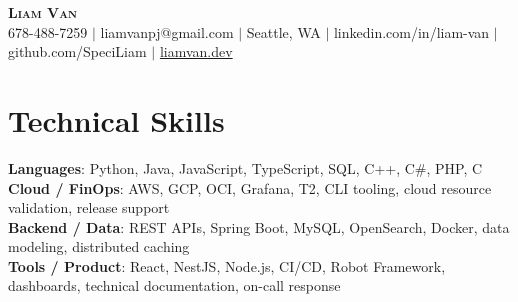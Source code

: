 \documentclass[letterpaper,11pt]{article}
\begin{document}

%
\begin{center}
    \textbf{\Huge \scshape Liam Van} \\ \vspace{1pt}
    \small 678-488-7259 $|$ \small {liamvanpj@gmail.com} $|$ Seattle, WA
 {{$|$ linkedin.com/in/liam-van} {$|$ github.com/SpeciLiam} {$|$ \href{https://liamvan.dev}{liamvan.dev}}}

\end{center}

\section{Technical Skills}
 \begin{itemize}[leftmargin=0.15in, label={}]
    \small{\item{
     \textbf{Languages}{: Python, Java, JavaScript, TypeScript, SQL, C++, C\#, PHP, C} \\
     \textbf{Cloud / FinOps}{: AWS, GCP, OCI, Grafana, T2, CLI tooling, cloud resource validation, release support} \\
     \textbf{Backend / Data}{: REST APIs, Spring Boot, MySQL, OpenSearch, Docker, data modeling, distributed caching} \\
     \textbf{Tools / Product}{: React, NestJS, Node.js, CI/CD, Robot Framework, dashboards, technical documentation, on-call response} \\
    }}
 \end{itemize}
%

\end{document}
